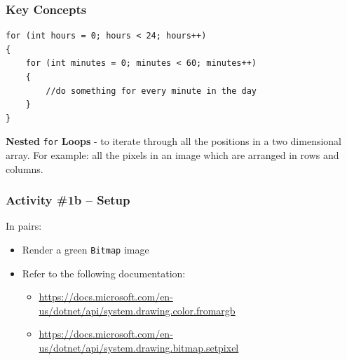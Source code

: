 \begin{frame}[fragile]
	\frametitle{Key Concepts}
	

	
	\begin{lstlisting}
for (int hours = 0; hours < 24; hours++)
{
	for (int minutes = 0; minutes < 60; minutes++)
	{
		//do something for every minute in the day
	}
}
	\end{lstlisting}
		\textbf{Nested} \texttt{for} \textbf{Loops} - to iterate through all the positions in a two dimensional array. For example: all the pixels in an image which are arranged in rows and columns.
	
\end{frame}

\begin{frame}
	\frametitle{Activity \#1b -- Setup}
	
	In pairs:
	
	\vspace{2em}
	
	\begin{itemize}		
		\item Render a green \texttt{Bitmap} image
		\item Refer to the following documentation:
		\begin{itemize}
			\item \url{https://docs.microsoft.com/en-us/dotnet/api/system.drawing.color.fromargb}
			\item \url{https://docs.microsoft.com/en-us/dotnet/api/system.drawing.bitmap.setpixel}
		\end{itemize}
	\end{itemize}
\end{frame}

